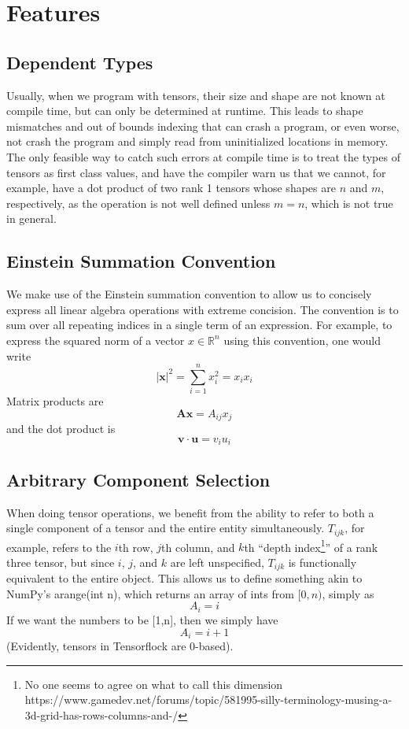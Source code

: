 \documentclass[12pt]{article}
\begin{document}
\section{Features}
\subsection{Dependent Types}
Usually, when we program with tensors, their size and shape are not known at compile time, but can only be determined at runtime. This leads to shape mismatches and out of bounds indexing that can crash a program, or even worse, not crash the program and simply read from uninitialized locations in memory. The only feasible way to catch such errors at compile time is to treat the types of tensors as first class values, and have the compiler warn us that we cannot, for example, have a dot product of two rank 1 tensors whose shapes are $n$ and $m$, respectively, as the operation is not well defined unless $m=n$, which is not true in general.
\subsection{Einstein Summation Convention}
We make use of the Einstein summation convention to allow us to concisely
express all linear algebra operations with extreme concision. The convention
is to sum over all repeating indices in a single term of an expression. For
example, to express the squared norm of a vector $x \in \mathbb{R}^n$ using
this convention, one would write \[ |\mathbf{x} |^2 = \sum_{i=1}^{n} x_i^2
= x_i x_i\] 
Matrix products are \[\mathbf{Ax} = A_{ij}x_{j}\] 
and the dot product is \[\mathbf{v} \cdot \mathbf{u} = v_i u_i\]
\subsection{Arbitrary Component Selection}
When doing tensor operations, we benefit from the ability to refer to both a single component 
of a tensor and the entire entity simultaneously. $T_{ijk}$, for example,
refers to the $i$th row, $j$th column,  and $k$th ``depth index\footnote{No one
seems to agree on what to call this dimension
https://www.gamedev.net/forums/topic/581995-silly-terminology-musing-a-3d-grid-has-rows-columns-and-/}''
of a rank three tensor, but since $i$, $j$, and $k$ are left unspecified, $T_{ijk}$
is functionally equivalent to the entire object. This allows us to define
something akin to NumPy's arange(int n), which returns an array of ints from $[0,n)$, simply as \[A_i = i\] If we want the numbers to be [1,n], then we simply have 
\[A_i = i+1\]
(Evidently, tensors in Tensorflock are 0-based).
\end{document}
